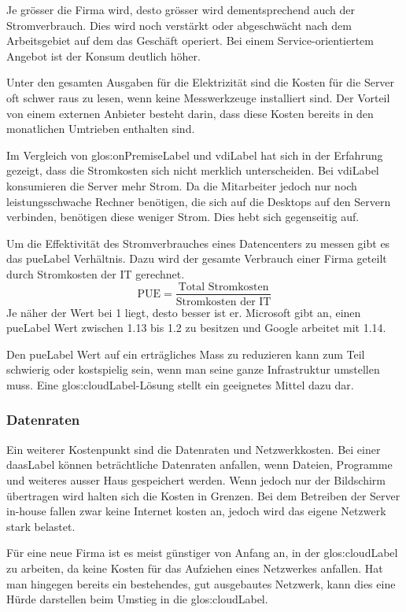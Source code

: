 Je grösser die Firma wird, desto grösser wird dementsprechend auch der Stromverbrauch. Dies wird noch verstärkt oder abgeschwächt nach dem Arbeitsgebiet auf dem das Geschäft operiert. Bei einem Service-orientiertem Angebot ist der Konsum deutlich höher.

Unter den gesamten Ausgaben für die Elektrizität sind die Kosten für die Server oft schwer raus zu lesen, wenn keine Messwerkzeuge installiert sind. Der Vorteil von einem externen Anbieter besteht darin, dass diese Kosten bereits in den monatlichen Umtrieben enthalten sind.

Im Vergleich von \gls{glos:onPremiseLabel} und \Gls{vdiLabel} hat sich in der Erfahrung gezeigt, dass die Stromkosten sich nicht merklich unterscheiden. Bei \Gls{vdiLabel} konsumieren die Server mehr Strom. Da die Mitarbeiter jedoch nur noch leistungsschwache Rechner benötigen, die sich auf die Desktops auf den Servern verbinden, benötigen diese weniger Strom. Dies hebt sich gegenseitig auf.

Um die Effektivität des Stromverbrauches eines Datencenters zu messen gibt es das \Gls{pueLabel} Verhältnis. Dazu wird der gesamte Verbrauch einer Firma geteilt durch Stromkosten der IT gerechnet.
\[\text{PUE} = \frac{\text{Total Stromkosten}}{\text{Stromkosten der IT}}\]
Je näher der Wert bei 1 liegt, desto besser ist er. Microsoft gibt an, einen \Gls{pueLabel} Wert zwischen 1.13 bis 1.2 zu besitzen und Google arbeitet mit 1.14.

Den \Gls{pueLabel} Wert auf ein erträgliches Mass zu reduzieren kann zum Teil schwierig oder kostspielig sein, wenn man seine ganze Infrastruktur umstellen muss. Eine \Gls{glos:cloudLabel}-Lösung stellt ein geeignetes Mittel dazu dar.

\subsubsection{Datenraten}
Ein weiterer Kostenpunkt sind die Datenraten und Netzwerkkosten. Bei einer \Gls{daasLabel} können beträchtliche Datenraten anfallen, wenn Dateien, Programme und weiteres ausser Haus gespeichert werden. Wenn jedoch nur der Bildschirm übertragen wird halten sich die Kosten in Grenzen. Bei dem Betreiben der Server in-house fallen zwar keine Internet kosten an, jedoch wird das eigene Netzwerk stark belastet.

Für eine neue Firma ist es meist günstiger von Anfang an, in der \Gls{glos:cloudLabel} zu arbeiten, da keine Kosten für das Aufziehen eines Netzwerkes anfallen.
Hat man hingegen bereits ein bestehendes, gut ausgebautes Netzwerk, kann dies eine Hürde darstellen beim Umstieg in die \Gls{glos:cloudLabel}.

